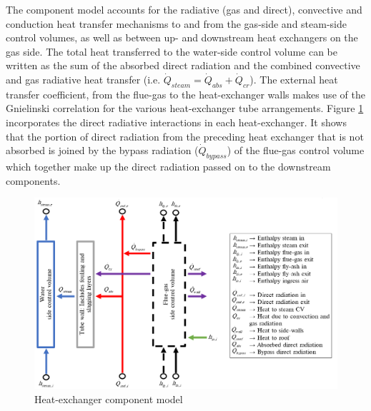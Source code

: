 \documentclass[review]{elsarticle}
\begin{document}
The component model accounts for the radiative (gas and direct), convective and conduction heat transfer mechanisms to and from the gas-side and steam-side control volumes, as well as between up- and downstream heat exchangers on the gas side. The total heat transferred to the water-side control volume can be written as the sum of the absorbed direct radiation and the combined convective and gas radiative heat transfer (i.e. $\dot{Q}_{steam}=\dot{Q}_{abs}+\dot{Q}_{cr}$). The external heat transfer coefficient, from the flue-gas to the heat-exchanger walls makes use of the Gnielinski correlation \cite{Gnielinski2016} for the various heat-exchanger tube arrangements. Figure \ref{fig_heat_exchanger_model} incorporates the direct radiative interactions in each heat-exchanger. It shows that the portion of direct radiation from the preceding heat exchanger that is not absorbed is joined by the bypass radiation ($\dot{Q}_{bypass}$) of the flue-gas control volume which together make up  the direct radiation passed on to the downstream components.
\begin{figure}[h!]
\centerline{\includegraphics[scale=0.5]{HEAT_EXCHANGER_PROCESS_MODEL}}
\caption{Heat-exchanger component model}
\label{fig_heat_exchanger_model}
\end{figure}

\newpage
\end{document}
